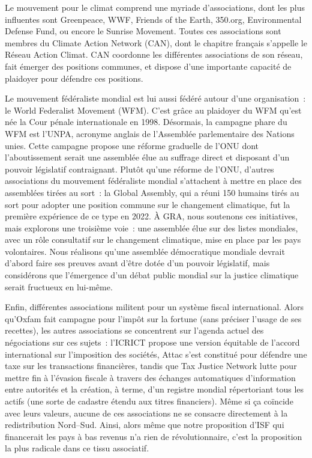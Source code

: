 \documentclass[a5paper,french]{memoir}
\begin{document}
Le mouvement pour le climat comprend une myriade d'associations, dont les plus influentes sont Greenpeace, WWF, Friends of the Earth, 350.org, Environmental Defense Fund, ou encore le Sunrise Movement. Toutes ces associations sont membres du Climate Action Network (CAN), dont le chapitre français s'appelle le Réseau Action Climat. CAN coordonne les différentes associations de son réseau, fait émerger des positions communes, et dispose d'une importante capacité de plaidoyer pour défendre ces positions. 

Le mouvement fédéraliste mondial est lui aussi fédéré autour d'une organisation~: le World Federalist Movement (WFM). C'est grâce au plaidoyer du WFM qu'est née la Cour pénale internationale en 1998. Désormais, la campagne phare du WFM est l'UNPA, acronyme anglais de l'Assemblée parlementaire des Nations unies. Cette campagne propose une réforme graduelle de l'ONU dont l'aboutissement serait une assemblée élue au suffrage direct et disposant d'un pouvoir législatif contraignant. Plutôt qu'une réforme de l'ONU, d'autres associations du mouvement fédéraliste mondial s'attachent à mettre en place des assemblées tirées au sort~: la Global Assembly, qui a réuni 150 humains tirés au sort pour adopter une position commune sur le changement climatique, fut la première expérience de ce type en 2022. À GRA, nous soutenons ces initiatives, mais explorons une troisième voie~: une assemblée élue sur des listes mondiales, avec un rôle consultatif sur le changement climatique, mise en place par les pays volontaires. Nous réalisons qu'une assemblée démocratique mondiale devrait d'abord faire ses preuves avant d'être dotée d'un pouvoir législatif, mais considérons que l'émergence d'un débat public mondial sur la justice climatique serait fructueux en lui-même. 

Enfin, différentes associations militent pour un système fiscal international. Alors qu'Oxfam fait campagne pour l'impôt sur la fortune (sans préciser l'usage de ses recettes), les autres associations se concentrent sur l'agenda actuel des négociations sur ces sujets~: l'ICRICT propose une version équitable de l'accord international sur l'imposition des sociétés, Attac s'est constitué pour défendre une taxe sur les transactions financières, tandis que Tax Justice Network lutte pour mettre fin à l'évasion fiscale à travers des échanges automatiques d'information entre autorités et la création, à terme, d'un registre mondial répertoriant tous les actifs (une sorte de cadastre étendu aux titres financiers). Même si ça coïncide avec leurs valeurs, aucune de ces associations ne se consacre directement à la redistribution Nord--Sud. Ainsi, alors même que notre proposition d'ISF qui financerait les pays à bas revenus n'a rien de révolutionnaire, c'est la proposition la plus radicale dans ce tissu associatif. 
\end{document}
